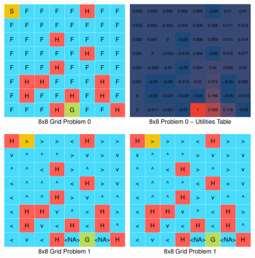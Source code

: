 \documentclass[11pt,]{article}
\begin{document}
\begin{center}\includegraphics[width=0.85\linewidth]{project_files/figure-latex/lakes3-1} \end{center}

\begin{center}\includegraphics[width=0.85\linewidth]{project_files/figure-latex/lakes3-2} \end{center}
\end{document}
